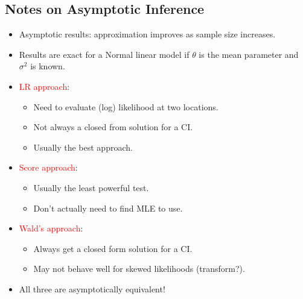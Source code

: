\documentclass[oneside]{book}\usepackage[]{graphicx}\usepackage[svgnames]{xcolor}
\begin{document}
\subsection*{Notes on Asymptotic Inference}
\begin{itemize}
      \item Asymptotic results: approximation improves as sample size increases.
      \item Results are exact for a Normal linear model if $ \theta $ is the mean parameter and $ \sigma^2 $ is
            known.
      \item \textcolor{Red}{LR approach}:
            \begin{itemize}
                  \item Need to evaluate (log) likelihood at two locations.
                  \item Not always a closed from solution for a CI.
                  \item Usually the best approach.
            \end{itemize}
      \item \textcolor{Red}{Score approach}:
            \begin{itemize}
                  \item Usually the least powerful test.
                  \item Don't actually need to find MLE to use.
            \end{itemize}
      \item \textcolor{Red}{Wald's approach}:
            \begin{itemize}
                  \item Always get a closed form solution for a CI.
                  \item May not behave well for skewed likelihoods (transform?).
            \end{itemize}
      \item All three are asymptotically equivalent!
\end{itemize}
\end{document}
